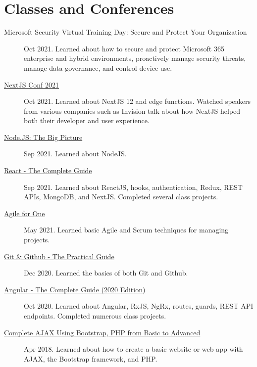 \documentclass{article}
\begin{document}
\vspace{-1em}
\section*{Classes and Conferences}\vspace{-0.5em}
\begin{description}
  \item [Microsoft Security Virtual Training Day: Secure and Protect Your Organization] Oct 2021. Learned about how to secure and protect Microsoft 365 enterprise and hybrid environments, proactively manage security threats, manage data governance, and control device use.
  \item [\href{https://www.linkedin.com/posts/alexander-koik-cestone-89304556_alexander-koik-cestones-nextjs-conf-ticket-activity-6855242508260184065-xJP9/}{NextJS Conf 2021}] Oct 2021. Learned about NextJS 12 and edge functions. Watched speakers from various companies such as Invision talk about how NextJS helped both their developer and user experience.
  \item [\href{https://sirkoik.github.io/CurriculumVitae/certifications/Nodejs-The-Big-Picture/certificate.pdf}{Node.JS: The Big Picture}] Sep 2021. Learned about NodeJS.
  \item [\href{https://www.udemy.com/certificate/UC-2196f0cf-2dce-4a11-9d8e-421827506ad1/}{React - The Complete Guide}] Sep 2021. Learned about ReactJS, hooks, authentication, Redux, REST APIs, MongoDB, and NextJS. Completed several class projects.
  \item [\href{https://sirkoik.github.io/CurriculumVitae/certifications/Agile-for-One/certificate.pdf}{Agile for One}] May 2021. Learned basic Agile and Scrum techniques for managing projects.
  \item [\href{https://sirkoik.github.io/CurriculumVitae/certifications/certificate-of-completion-for-git-github-the-practical-guide.pdf}{Git \& Github - The Practical Guide}] Dec 2020. Learned the basics of both Git and Github.
  \item [\href{https://www.udemy.com/certificate/UC-624f6f83-940e-428f-accd-d16113661ded}{Angular - The Complete Guide (2020 Edition)}] Oct 2020. Learned about Angular, RxJS, NgRx, routes, guards, REST API endpoints. Completed numerous class projects.
  \item [\href{https://www.udemy.com/certificate/UC-E3EMJE4O}{Complete AJAX Using Bootstrap, PHP from Basic to Advanced}] Apr 2018. Learned about how to create a basic website or web app with AJAX, the Bootstrap framework, and PHP.

\end{description}
\end{document}
